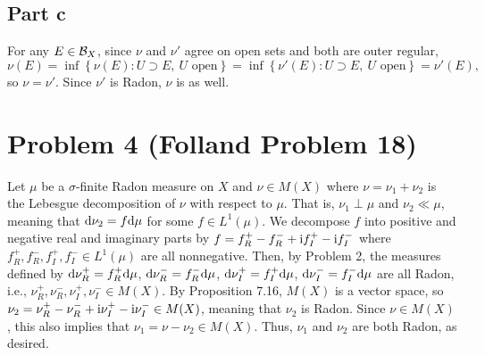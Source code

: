 \documentclass{article}
\begin{document}
\subsection{Part c}
For any $E\in{\cal B}_X$, since $\nu$ and $\nu'$ agree on open sets and both are outer regular,
\[
\nu(E)=\inf\left\{\nu(E):U\supset E,~U\text{ open}\right\}=\inf\left\{\nu'(E):U\supset E,~U\text{ open}\right\}=\nu'(E),
\]
so $\nu=\nu'$. Since $\nu'$ is Radon, $\nu$ is as well.

\section{Problem 4 (Folland Problem 18)}
Let $\mu$ be a $\sigma$-finite Radon measure on $X$ and $\nu\in M(X)$ where $\nu=\nu_1+\nu_2$ is the Lebesgue decomposition of $\nu$ with respect to $\mu$. That is, $\nu_1\perp\mu$ and $\nu_2\ll\mu$, meaning that $\mathrm{d}\nu_2=f\mathrm{d}\mu$ for some $f\in L^1(\mu)$. We decompose $f$ into positive and negative real and imaginary parts by $f=f_R^+-f_R^-+\mathrm{i} f_I^+-\mathrm{i} f_I^-$ where $f_R^+,f_R^-,f_I^+,f_I^-\in L^1(\mu)$ are all nonnegative. Then, by Problem 2, the measures defined by $\mathrm{d}\nu_R^+=f_R^+\mathrm{d}\mu$, $\mathrm{d}\nu_R^-=f_R^-\mathrm{d}\mu$, $\mathrm{d}\nu_I^+=f_I^+\mathrm{d}\mu$, $\mathrm{d}\nu_I^-=f_I^-\mathrm{d}\mu$ are all Radon, i.e., $\nu_R^+,\nu_R^-,\nu_I^+,\nu_I^-\in M(X)$. By Proposition 7.16, $M(X)$ is a vector space, so $\nu_2=\nu_R^+-\nu_R^-+\mathrm{i}\nu_I^+-\mathrm{i}\nu_I^-\in M(X)$, meaning that $\nu_2$ is Radon. Since $ \nu\in M(X)$, this also implies that $\nu_1=\nu-\nu_2\in M(X)$. Thus, $\nu_1$ and $\nu_2$ are both Radon, as desired.
\end{document}
